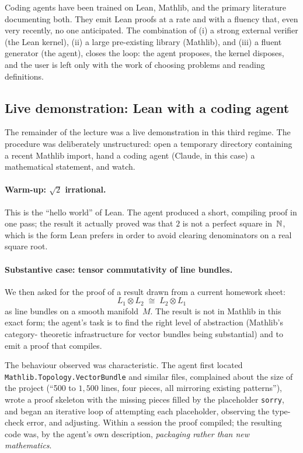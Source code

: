 \begin{keyresult}\label{kr:formalisation-now}
  Coding agents have been trained on Lean, Mathlib, and the
  primary literature documenting both.  They emit Lean
  proofs at a rate and with a fluency that, even very
  recently, no one anticipated.  The combination of
  (i) a strong external verifier (the Lean kernel),
  (ii) a large pre-existing library (Mathlib), and
  (iii) a fluent generator (the agent),
  closes the loop: the agent proposes, the kernel disposes,
  and the user is left only with the work of choosing
  problems and reading definitions.
\end{keyresult}

\subsection{Live demonstration: Lean with a coding agent}\label{sec:lean-demo}

The remainder of the lecture was a live demonstration in
this third regime.  The procedure was deliberately
unstructured: open a temporary directory containing a
recent Mathlib import, hand a coding agent (Claude, in this
case) a mathematical statement, and watch.

\paragraph{Warm-up: $\sqrt{2}$ irrational.}
This is the ``hello world'' of Lean.  The agent produced a
short, compiling proof in one pass; the result it actually
proved was that $2$ is not a perfect square in~$\mathbb{N}$, which
is the form Lean prefers in order to avoid clearing
denominators on a real square root.

\paragraph{Substantive case: tensor commutativity of line bundles.}
We then asked for the proof of a result drawn from a current
homework sheet:
\[
  L_1 \otimes L_2 \;\cong\; L_2 \otimes L_1
\]
as line bundles on a smooth manifold~$M$.  The result is
not in Mathlib in this exact form; the agent's task is to
find the right level of abstraction (Mathlib's category-
theoretic infrastructure for vector bundles being
substantial) and to emit a proof that compiles.

The behaviour observed was characteristic.  The agent first
located \texttt{Mathlib.Topology.VectorBundle} and similar
files, complained about the size of the project (``500 to
$1{,}500$ lines, four pieces, all mirroring existing
patterns''), wrote a proof skeleton with the missing pieces
filled by the placeholder \texttt{sorry}, and began an
iterative loop of attempting each placeholder, observing
the type-check error, and adjusting.  Within a session the
proof compiled; the resulting code was, by the agent's own
description, \emph{packaging rather than new mathematics}.

